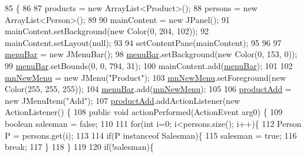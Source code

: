 \begin{DoxyCode}
85                              \{
86         
87         products = \textcolor{keyword}{new} ArrayList<Product>();
88         persons = \textcolor{keyword}{new} ArrayList<Person>();
89         
90         mainContent = \textcolor{keyword}{new} JPanel();
91         mainContent.setBackground(\textcolor{keyword}{new} Color(0, 204, 102));
92         mainContent.setLayout(null);
93         
94         setContentPane(mainContent);
95         
96         
97         \hyperlink{classpkg_1_1_management_u_i_ace9ff91bcebb641b7363e764eae00310}{menuBar} = \textcolor{keyword}{new} JMenuBar();
98         \hyperlink{classpkg_1_1_management_u_i_ace9ff91bcebb641b7363e764eae00310}{menuBar}.setBackground(\textcolor{keyword}{new} Color(0, 153, 0));
99         \hyperlink{classpkg_1_1_management_u_i_ace9ff91bcebb641b7363e764eae00310}{menuBar}.setBounds(0, 0, 794, 31);
100         mainContent.add(\hyperlink{classpkg_1_1_management_u_i_ace9ff91bcebb641b7363e764eae00310}{menuBar});
101         
102         \hyperlink{classpkg_1_1_management_u_i_a02082701769fb188544b2211ebc5f759}{mnNewMenu} = \textcolor{keyword}{new} JMenu(\textcolor{stringliteral}{"Product"});
103         \hyperlink{classpkg_1_1_management_u_i_a02082701769fb188544b2211ebc5f759}{mnNewMenu}.setForeground(\textcolor{keyword}{new} Color(255, 255, 255));
104         \hyperlink{classpkg_1_1_management_u_i_ace9ff91bcebb641b7363e764eae00310}{menuBar}.add(\hyperlink{classpkg_1_1_management_u_i_a02082701769fb188544b2211ebc5f759}{mnNewMenu});
105         
106         \hyperlink{classpkg_1_1_management_u_i_afafd026c860294aea147d42bad8ac11f}{productAdd} = \textcolor{keyword}{new} JMenuItem(\textcolor{stringliteral}{"Add"});
107         \hyperlink{classpkg_1_1_management_u_i_afafd026c860294aea147d42bad8ac11f}{productAdd}.addActionListener(\textcolor{keyword}{new} ActionListener() \{
108             \textcolor{keyword}{public} \textcolor{keywordtype}{void} actionPerformed(ActionEvent arg0) \{
109                 \textcolor{keywordtype}{boolean} salesman = \textcolor{keyword}{false};
110                 
111                 \textcolor{keywordflow}{for}(\textcolor{keywordtype}{int} i=0; i<persons.size(); i++)\{
112                     Person P = persons.get(i);
113                     
114                     \textcolor{keywordflow}{if}(P instanceof Salesman)\{
115                         salesman = \textcolor{keyword}{true};
116                         \textcolor{keywordflow}{break};
117                     \}
118                 \}
119                 
120                 \textcolor{keywordflow}{if}(!salesman)\{

\end{DoxyCode}
